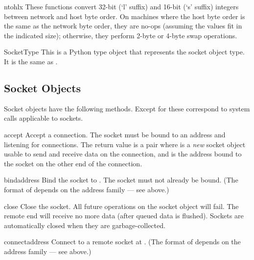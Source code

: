 \begin{funcdesc}{ntohl}{x}
These functions convert 32-bit (`l' suffix) and 16-bit (`s' suffix)
integers between network and host byte order.  On machines where the
host byte order is the same as the network byte order, they are no-ops
(assuming the values fit in the indicated size); otherwise, they
perform 2-byte or 4-byte swap operations.
\end{funcdesc}

\begin{datadesc}{SocketType}
This is a Python type object that represents the socket object type.
It is the same as .
\end{datadesc}

\subsection{Socket Objects}

\noindent
Socket objects have the following methods.  Except for
 these correspond to \UNIX{} system calls applicable to
sockets.

\renewcommand{\indexsubitem}{(socket method)}
\begin{funcdesc}{accept}{}
Accept a connection.
The socket must be bound to an address and listening for connections.
The return value is a pair 
where  is a \emph{new} socket object usable to send and
receive data on the connection, and  is the address bound
to the socket on the other end of the connection.
\end{funcdesc}

\begin{funcdesc}{bind}{address}
Bind the socket to .  The socket must not already be bound.
(The format of  depends on the address family --- see above.)
\end{funcdesc}

\begin{funcdesc}{close}{}
Close the socket.  All future operations on the socket object will fail.
The remote end will receive no more data (after queued data is flushed).
Sockets are automatically closed when they are garbage-collected.
\end{funcdesc}

\begin{funcdesc}{connect}{address}
Connect to a remote socket at .
(The format of  depends on the address family --- see above.)
\end{funcdesc}

